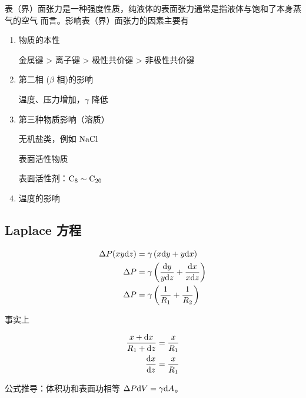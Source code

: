 表（界）面张力是一种强度性质，纯液体的表面张力通常是指液体与饱和了本身蒸气的空气
而言。影响表（界）面张力的因素主要有

\begin{enumerate}
    \item 物质的本性 \par
          金属键 > 离子键 > 极性共价键 > 非极性共价键
    \item 第二相 ($\beta$ 相)的影响 \par
          温度、压力增加，$\gamma$ 降低
    \item 第三种物质影响（溶质）\par
          无机盐类，例如 $\ce{NaCl}$ \par
          表面活性物质 \par
          表面活性剂：$\ce{C8} \sim \ce{C_{20}}$
    \item 温度的影响
\end{enumerate}


\subsection{Laplace 方程}


\begin{align}
    \Delta P (xy \mathrm{d} z) & = \gamma \left(x \mathrm{d} y + y \mathrm{d} x\right)                           \\
    \Delta P           & = \gamma \left(\frac{\mathrm{d} y}{y \mathrm{d} z} + \frac{\mathrm{d} x}{x \mathrm{d} z}\right) \\
    \Delta P           & = \gamma \left(\frac{1}{R_1} + \frac{1}{R_2}\right)
\end{align}

事实上

\begin{align}
    \frac{x + \mathrm{d} x}{R_1 + \mathrm{d} z} & = \frac{x}{R_1} \\
    \frac{\mathrm{d} x}{\mathrm{d} z}           & = \frac{x}{R_1}
\end{align}

公式推导：体积功和表面功相等 $\Delta P \mathrm{d} V = \gamma \mathrm{d} A$。
